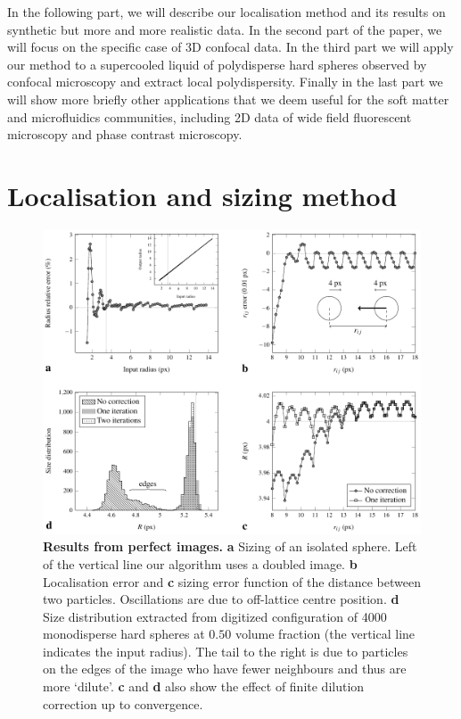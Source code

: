 \documentclass[8.5pt,twoside,twocolumn]{article}
\begin{document}
In the following part, we will describe our localisation method and its results on synthetic but more and more realistic data. In the second part of the paper, we will focus on the specific case of 3D confocal data. In the third part we will apply our method to a supercooled liquid of polydisperse hard spheres observed by confocal microscopy and extract local polydispersity. Finally in the last part we will show more briefly other applications that we deem useful for the soft matter and microfluidics communities, including 2D data of wide field fluorescent microscopy and phase contrast microscopy.

\section*{Localisation and sizing method}

\begin{figure}
\centering
\includegraphics{fig_perfect.pdf}
	\caption{\textbf{Results from perfect images.} \textbf{a} Sizing of an isolated sphere. Left of the vertical line our algorithm uses a doubled image. \textbf{b} Localisation error and \textbf{c} sizing error function of the distance between two particles. Oscillations are due to off-lattice centre position. \textbf{d} Size distribution extracted from digitized configuration of 4000 monodisperse hard spheres at $0.50$ volume fraction (the vertical line indicates the input radius). The tail to the right is due to particles on the edges of the image who have fewer neighbours and thus are more `dilute'. \textbf{c} and \textbf{d} also show the effect of finite dilution correction up to convergence.}
	\label{fig:perfect}
\end{figure}
\end{document}
